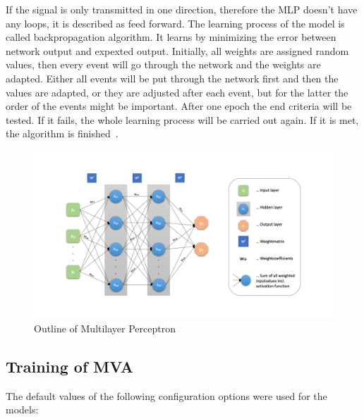 \documentclass[11pt]{scrartcl}
\begin{document}
	If the signal is only transmitted in one direction, therefore the MLP doesn't have any loops, it is described as feed forward. The learning process of the model is called backpropagation algorithm. It learns by minimizing the error between network output and expexted output. Initially, all weights are assigned random values, then every event will go through the network and the weights are adapted. Either all events will be put through the network first and then the values are adapted, or they are adjusted after each event, but for the latter the order of the events might be important. After one epoch the end criteria will be tested. If it fails, the whole learning process will be carried out again. If it is met, the algorithm is finished~\cite{MLP09}.
	
\begin{figure}[H]
	\begin{center}
	\includegraphics[width=1\textwidth]{figures/MLP.png}
	\caption{Outline of Multilayer Perceptron}
	\label{fig:MLP}
	\end{center}
\end{figure}

	\subsection{Training of MVA}
	
	The default values of the following configuration options were used for the models:
	
\end{document}
